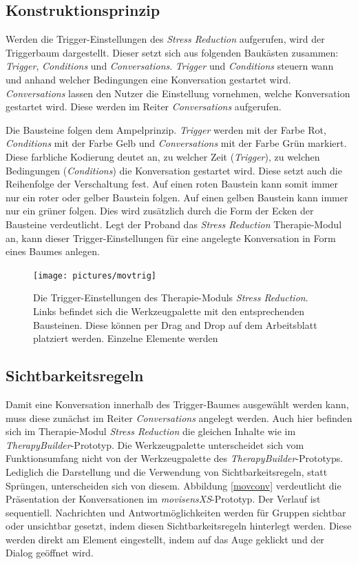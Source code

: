 \subsection{Konstruktionsprinzip}
Werden die Trigger-Einstellungen des \emph{Stress Reduction} aufgerufen, wird der Triggerbaum dargestellt. Dieser setzt sich aus folgenden Baukästen zusammen: \emph{Trigger}, \emph{Conditions} und \emph{Conversations}. \emph{Trigger} und \emph{Conditions} steuern wann und anhand welcher Bedingungen eine Konversation gestartet wird.  \emph{Conversations} lassen den Nutzer die Einstellung vornehmen, welche Konversation gestartet wird. Diese werden im Reiter \emph{Conversations} aufgerufen. 

Die Bausteine folgen dem Ampelprinzip. \emph{Trigger} werden mit der Farbe Rot, \emph{Conditions} mit der Farbe Gelb und \emph{Conversations} mit der Farbe Grün markiert. Diese farbliche Kodierung deutet an, zu welcher Zeit (\emph{Trigger}), zu welchen Bedingungen (\emph{Conditions}) die Konversation gestartet wird. Diese setzt auch die Reihenfolge der Verschaltung fest. Auf einen roten Baustein kann somit immer nur ein roter oder gelber Baustein folgen. Auf einen gelben Baustein kann immer nur ein grüner folgen. Dies wird zusätzlich durch die Form der Ecken der Bausteine verdeutlicht. Legt der Proband das \emph{Stress Reduction} Therapie-Modul an, kann dieser Trigger-Einstellungen für eine angelegte Konversation in Form eines Baumes anlegen.  

\begin{figure}[h]
\centering
\texttt{[image: pictures/movtrig]}
\caption{Die Trigger-Einstellungen des Therapie-Moduls \emph{Stress Reduction}. Links befindet sich die Werkzeugpalette mit den entsprechenden Bausteinen. Diese können per Drag and Drop auf dem Arbeitsblatt platziert werden. Einzelne Elemente werden}
\label{start}
\end{figure}



\subsection{Sichtbarkeitsregeln}
Damit eine Konversation innerhalb des Trigger-Baumes ausgewählt werden kann, muss diese zunächst im Reiter \emph{Conversations} angelegt werden. Auch hier befinden sich im Therapie-Modul \emph{Stress Reduction} die gleichen Inhalte wie im \emph{TherapyBuilder}-Prototyp. Die Werkzeugpalette unterscheidet sich vom Funktionsumfang nicht von der Werkzeugpalette des \emph{TherapyBuilder}-Prototyps. Lediglich die Darstellung und die Verwendung von Sichtbarkeitsregeln, statt Sprüngen, unterscheiden sich von diesem. Abbildung \ref{movconv} verdeutlicht die Präsentation der Konversationen im \emph{movisensXS}-Prototyp. Der Verlauf ist sequentiell. Nachrichten und Antwortmöglichkeiten werden für Gruppen sichtbar oder unsichtbar gesetzt, indem diesen Sichtbarkeitsregeln hinterlegt werden. Diese werden direkt am Element eingestellt, indem auf das Auge geklickt und der Dialog geöffnet wird.

